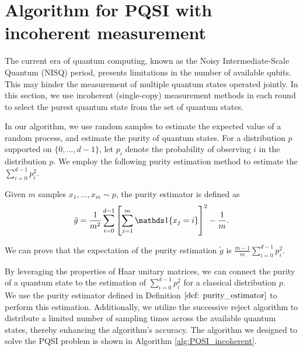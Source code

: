 \section{Algorithm for PQSI with incoherent measurement}
\label{sec: PQSI_inco}

The current era of quantum computing, known as the Noisy Intermediate-Scale Quantum (NISQ) period, presents limitations in the number of available qubits. This may hinder the measurement of multiple quantum states operated jointly. In this section, we use incoherent (single-copy) measurement methods in each round to select the purest quantum state from the set of quantum states.

In our algorithm, we use random samples to estimate the expected value of a random process, and estimate the purity of quantum states. For a distribution $p$ supported on $\{0,...,d-1\}$, let $p_i$ denote the probability of observing $i$ in the distribution $p$. We employ the following purity estimation method to estimate the $\sum_{i=0}^{d-1}p_i^2$.

\begin{definition}
    \label{def: purity_estimator}
    Given $m$ samples $x_1,...,x_m \sim p$, the purity estimator is defined as 
    \begin{equation} \label{eq:purity_estimator}
        \tilde{g} = \frac{1}{m^2} \sum_{i=0}^{d-1} \left[ \sum_{j=1}^m \indicator\{x_j =i\}\right]^2 - \frac{1}{m}.
    \end{equation}
\end{definition}

We can prove that the expectation of the purity estimation $\tilde{g}$ is $\frac{m-1}{m}\sum_{i=0}^{d-1} p_i^2$.



By leveraging the properties of Haar unitary matrices, we can connect the purity of a quantum state to the estimation of $ \sum_{i=0}^{d-1} p_i^2 $ for a classical distribution $ p $. We use the purity estimator defined in Definition $\ref{def: purity_estimator}$ to perform this estimation. Additionally, we utilize the successive reject algorithm to distribute a limited number of sampling times across the available quantum states, thereby enhancing the algorithm's accuracy. The algorithm we designed to solve the PQSI problem is shown in Algorithm \ref{alg:PQSI_incoherent}.

